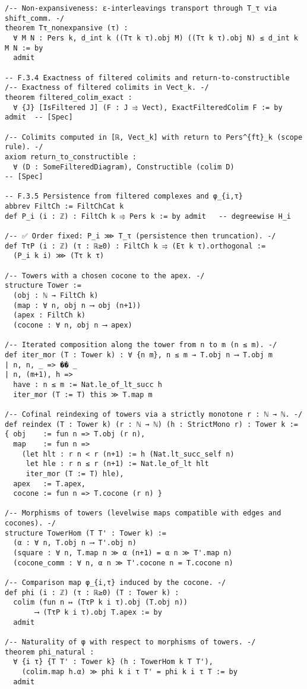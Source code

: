 \documentclass[11pt]{article}
\numberwithin{equation}{section}
\theoremstyle{definition}
\begin{document}
\begin{verbatim}
/-- Non-expansiveness: ε-interleavings transport through T_τ via shift_comm. -/
theorem Tτ_nonexpansive (τ) :
  ∀ M N : Pers k, d_int k ((Tτ k τ).obj M) ((Tτ k τ).obj N) ≤ d_int k M N := by
  admit

-- F.3.4 Exactness of filtered colimits and return-to-constructible
/-- Exactness of filtered colimits in Vect_k. -/
theorem filtered_colim_exact :
  ∀ {J} [IsFiltered J] (F : J ⥤ Vect), ExactFilteredColim F := by admit  -- [Spec]

/-- Colimits computed in [ℝ, Vect_k] with return to Pers^{ft}_k (scope rule). -/
axiom return_to_constructible :
  ∀ (D : SomeFilteredDiagram), Constructible (colim D)                      -- [Spec]

-- F.3.5 Persistence from filtered complexes and φ_{i,τ}
abbrev FiltCh := FiltChCat k
def P_i (i : ℤ) : FiltCh k ⥤ Pers k := by admit   -- degreewise H_i

/-- ✅ Order fixed: P_i ⋙ T_τ (persistence then truncation). -/
def TτP (i : ℤ) (τ : ℝ≥0) : FiltCh k ⥤ (Eτ k τ).orthogonal :=
  (P_i k i) ⋙ (Tτ k τ)

/-- Towers with a chosen cocone to the apex. -/
structure Tower :=
  (obj : ℕ → FiltCh k)
  (map : ∀ n, obj n ⟶ obj (n+1))
  (apex : FiltCh k)
  (cocone : ∀ n, obj n ⟶ apex)

/-- Iterated composition along the tower from n to m (n ≤ m). -/
def iter_mor (T : Tower k) : ∀ {n m}, n ≤ m → T.obj n ⟶ T.obj m
| n, n, _ => �� _
| n, (m+1), h =>
  have : n ≤ m := Nat.le_of_lt_succ h
  iter_mor (T := T) this ≫ T.map m

/-- Cofinal reindexing of towers via a strictly monotone r : ℕ → ℕ. -/
def reindex (T : Tower k) (r : ℕ → ℕ) (h : StrictMono r) : Tower k :=
{ obj    := fun n => T.obj (r n),
  map    := fun n =>
    (let hlt : r n < r (n+1) := h (Nat.lt_succ_self n)
     let hle : r n ≤ r (n+1) := Nat.le_of_lt hlt
     iter_mor (T := T) hle),
  apex   := T.apex,
  cocone := fun n => T.cocone (r n) }

/-- Morphisms of towers (levelwise maps compatible with edges and cocones). -/
structure TowerHom (T T' : Tower k) :=
  (α : ∀ n, T.obj n ⟶ T'.obj n)
  (square : ∀ n, T.map n ≫ α (n+1) = α n ≫ T'.map n)
  (cocone_comm : ∀ n, α n ≫ T'.cocone n = T.cocone n)

/-- Comparison map φ_{i,τ} induced by the cocone. -/
def phi (i : ℤ) (τ : ℝ≥0) (T : Tower k) :
  colim (fun n ↦ (TτP k i τ).obj (T.obj n))
       ⟶ (TτP k i τ).obj T.apex := by
  admit

/-- Naturality of φ with respect to morphisms of towers. -/
theorem phi_natural :
  ∀ {i τ} {T T' : Tower k} (h : TowerHom k T T'),
    (colim.map h.α) ≫ phi k i τ T' = phi k i τ T := by
  admit


\end{verbatim}
\end{document}
